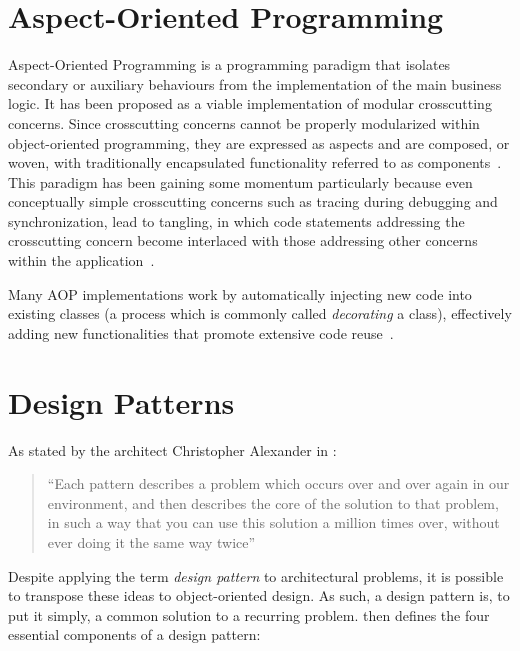 \section{Aspect-Oriented Programming}\label{sec:aspect_oriented_programming}

Aspect-Oriented Programming is a programming paradigm that isolates secondary or auxiliary behaviours from the implementation of the main business logic. It has been proposed as a viable implementation of modular crosscutting concerns. Since crosscutting concerns cannot be properly modularized within object-oriented programming, they are expressed as aspects and are composed, or woven, with traditionally encapsulated functionality referred to as components~\cite{KM05, Ste06}. This paradigm has been gaining some momentum particularly because even conceptually simple crosscutting concerns such as tracing during debugging and synchronization, lead to tangling, in which code statements addressing the crosscutting concern become interlaced with those addressing other concerns within the application~\cite{LC03}.

Many AOP implementations work by automatically injecting new code into existing classes (a process which is commonly called \emph{decorating} a class), effectively adding new functionalities that promote extensive code reuse~\cite{Ste06, LC03, metaclass_programming_in_python}.

\section{Design Patterns}\label{sec:design_patterns}

As stated by the architect Christopher Alexander in \cite{christopher_alexander_a_pattern_language}:

\begin{quote}
  ``Each pattern describes a problem which occurs over and over again in our environment, and then describes the core of the solution to that problem, in such a way that you can use this solution a million times over, without ever doing it the same way twice''
\end{quote}

Despite applying the term \emph{design pattern} to architectural problems, it is possible to transpose these ideas to object-oriented design. As such, a design pattern is, to put it simply, a common solution to a recurring problem. \cite{gang_of_four} then defines the four essential components of a design pattern:

